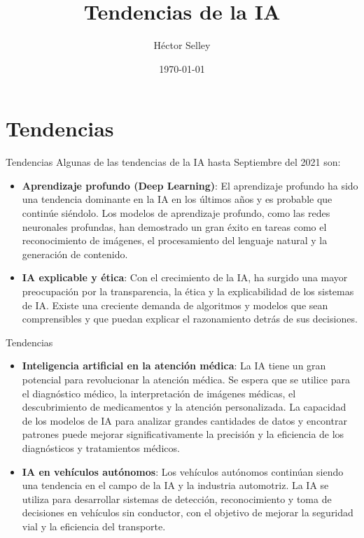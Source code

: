 \documentclass[11pt,aspectratio=169]{beamer}
\author{Héctor Selley}
\title{Tendencias de la IA}
\institute{Universidad Anáhuac México}
\date{\today}
\begin{document}

\begin{frame}
	\titlepage
\end{frame}


\section{Tendencias}
\begin{frame}{Tendencias}
	Algunas de las tendencias de la IA hasta Septiembre del 2021 son:
	\begin{itemize}
		\item \textbf{Aprendizaje profundo (Deep Learning)}: El aprendizaje profundo ha sido una tendencia dominante en la IA 
			en los últimos años y es probable que continúe siéndolo. Los modelos de aprendizaje profundo, como las redes 
			neuronales profundas, han demostrado un gran éxito en tareas como el reconocimiento de imágenes, el procesamiento 
			del lenguaje natural y la generación de contenido.\pause
		\item \textbf{IA explicable y ética}: Con el crecimiento de la IA, ha surgido una mayor preocupación por la transparencia, 
			la ética y la explicabilidad de los sistemas de IA. Existe una creciente demanda de algoritmos y modelos que sean 
			comprensibles y que puedan explicar el razonamiento detrás de sus decisiones.
	\end{itemize}
\end{frame}

\begin{frame}{Tendencias}
	\begin{itemize}
		\item \textbf{Inteligencia artificial en la atención médica}: La IA tiene un gran potencial para revolucionar la atención 
			médica. Se espera que se utilice para el diagnóstico médico, la interpretación de imágenes médicas, el descubrimiento 
			de medicamentos y la atención personalizada. La capacidad de los modelos de IA para analizar grandes cantidades de datos 
			y encontrar patrones puede mejorar significativamente la precisión y la eficiencia de los diagnósticos y tratamientos 
			médicos.\pause
		\item \textbf{IA en vehículos autónomos}: Los vehículos autónomos continúan siendo una tendencia en el campo de la IA 
			y la industria automotriz. La IA se utiliza para desarrollar sistemas de detección, reconocimiento y toma de decisiones 
			en vehículos sin conductor, con el objetivo de mejorar la seguridad vial y la eficiencia del transporte.
	\end{itemize}
\end{frame}
\end{document}
